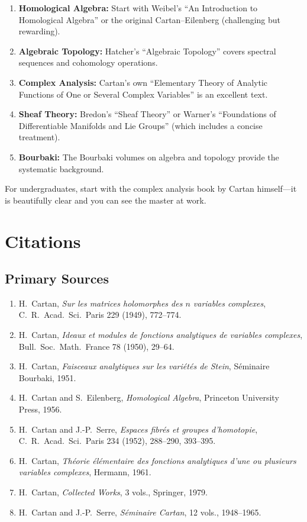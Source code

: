 \begin{enumerate}
    \item \textbf{Homological Algebra:} Start with Weibel's ``An Introduction to Homological Algebra'' or the original Cartan--Eilenberg (challenging but rewarding).
    \item \textbf{Algebraic Topology:} Hatcher's ``Algebraic Topology'' covers spectral sequences and cohomology operations.
    \item \textbf{Complex Analysis:} Cartan's own ``Elementary Theory of Analytic Functions of One or Several Complex Variables'' is an excellent text.
    \item \textbf{Sheaf Theory:} Bredon's ``Sheaf Theory'' or Warner's ``Foundations of Differentiable Manifolds and Lie Groups'' (which includes a concise treatment).
    \item \textbf{Bourbaki:} The Bourbaki volumes on algebra and topology provide the systematic background.
\end{enumerate}

For undergraduates, start with the complex analysis book by Cartan himself---it is beautifully clear and you can see the master at work.

\section{Citations}\subsection*{Primary Sources}
\begin{enumerate}
    \item H.\ Cartan, \textit{Sur les matrices holomorphes des $n$ variables complexes}, C.\ R.\ Acad.\ Sci.\ Paris 229 (1949), 772--774.
    \item H.\ Cartan, \textit{Ideaux et modules de fonctions analytiques de variables complexes}, Bull.\ Soc.\ Math.\ France 78 (1950), 29--64.
    \item H.\ Cartan, \textit{Faisceaux analytiques sur les vari{\'e}t{\'e}s de Stein}, S{\'e}minaire Bourbaki, 1951.
    \item H.\ Cartan and S.\ Eilenberg, \textit{Homological Algebra}, Princeton University Press, 1956.
    \item H.\ Cartan and J.-P.\ Serre, \textit{Espaces fibr{\'e}s et groupes d'homotopie}, C.\ R.\ Acad.\ Sci.\ Paris 234 (1952), 288--290, 393--395.
    \item H.\ Cartan, \textit{Th{\'e}orie {\'e}l{\'e}mentaire des fonctions analytiques d'une ou plusieurs variables complexes}, Hermann, 1961.
    \item H.\ Cartan, \textit{Collected Works}, 3 vols., Springer, 1979.
    \item H.\ Cartan and J.-P.\ Serre, \textit{S{\'e}minaire Cartan}, 12 vols., 1948--1965.
\end{enumerate}

